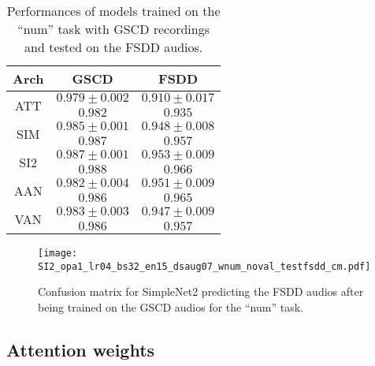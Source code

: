 \begin{table}[h!]
    \centering
    \caption{Performances of models trained on the ``num'' task with GSCD
        recordings and tested on the FSDD audios.
    }
    \label{tab:fsdd_performance}
    \begin{tabular}{|c|cc|}
        \hline
        Arch & GSCD & FSDD \\
        \hline
        \multirow{2}{*}{ATT}
            & $0.979 \pm 0.002$    & $0.910 \pm 0.017$ \\
            & $0.982$              & $0.935$ \\
        \hline
        \multirow{2}{*}{SIM}
            & $0.985 \pm 0.001$    & $0.948 \pm 0.008$ \\
            & $0.987$              & $0.957$ \\
        \multirow{2}{*}{SI2}
            & $0.987 \pm 0.001$    & $0.953 \pm 0.009$ \\
            & $0.988$              & $0.966$ \\
        \multirow{2}{*}{AAN}
            & $0.982 \pm 0.004$    & $0.951 \pm 0.009$ \\
            & $0.986$              & $0.965$ \\
        \multirow{2}{*}{VAN}
            & $0.983 \pm 0.003$    & $0.947 \pm 0.009$ \\
            & $0.986$              & $0.957$ \\
        \hline
    \end{tabular}
\end{table}

\begin{figure}[t!]
    \centering
    \texttt{[image: SI2\_opa1\_lr04\_bs32\_en15\_dsaug07\_wnum\_noval\_testfsdd\_cm.pdf]}
    \caption{Confusion matrix for SimpleNet2 predicting the
        FSDD audios after being trained on the GSCD audios for the ``num'' task.
    }%
    \label{fig:SI2_opa1_lr04_bs32_en15_dsaug07_wnum_noval_testfsdd_cm}
\end{figure}

\subsection{Attention weights}


